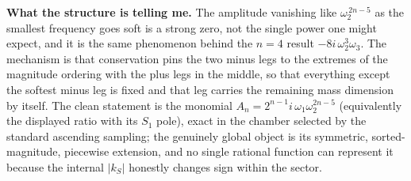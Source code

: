 \documentclass[11pt]{article}
\begin{document}
\medskip
\noindent\textbf{What the structure is telling me.}
The amplitude vanishing like $\omega_2^{\,2n-5}$ as the smallest frequency goes soft is a
strong zero, not the single power one might expect, and it is the same phenomenon behind the
$n=4$ result $-8i\,\omega_2^3\omega_3$. The mechanism is that conservation pins the two minus
legs to the extremes of the magnitude ordering with the plus legs in the middle, so that
everything except the softest minus leg is fixed and that leg carries the remaining mass
dimension by itself. The clean statement is the monomial $A_n=2^{n-1}i\,\omega_1\omega_2^{2n-5}$
(equivalently the displayed ratio with its $S_1$ pole), exact in the chamber selected by the
standard ascending sampling; the genuinely global object is its symmetric, sorted-magnitude,
piecewise extension, and no single rational function can represent it because the internal
$|k_S|$ honestly changes sign within the sector.
\end{document}

